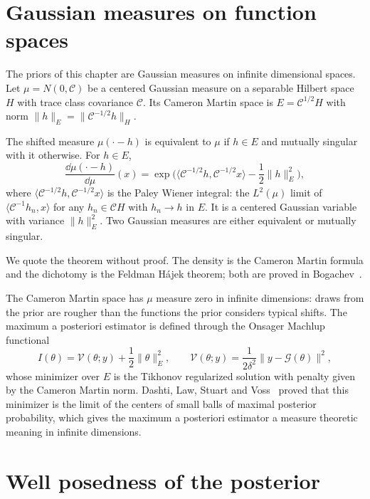 \section{Gaussian measures on function spaces}

The priors of this chapter are Gaussian measures on infinite dimensional spaces. Let $\mu = N(0,\mathcal{C})$ be a centered Gaussian measure on a separable Hilbert space $H$ with trace class covariance $\mathcal{C}$. Its Cameron Martin space is $E = \mathcal{C}^{1/2}H$ with norm $\|h\|_E = \|\mathcal{C}^{-1/2}h\|_H$.

\begin{theorem}
\label{thm:cameron_martin}
The shifted measure $\mu(\cdot-h)$ is equivalent to $\mu$ if $h\in E$ and mutually singular with it otherwise. For $h\in E$,
\[
\frac{\dd\mu(\cdot-h)}{\dd\mu}(x) = \exp\Big(\langle\mathcal{C}^{-1/2}h,\mathcal{C}^{-1/2}x\rangle-\frac12\|h\|_E^2\Big),
\]
where $\langle\mathcal{C}^{-1/2}h,\mathcal{C}^{-1/2}x\rangle$ is the Paley Wiener integral: the $L^2(\mu)$ limit of $\langle\mathcal{C}^{-1}h_n,x\rangle$ for any $h_n\in\mathcal{C}H$ with $h_n\to h$ in $E$. It is a centered Gaussian variable with variance $\|h\|_E^2$. Two Gaussian measures are either equivalent or mutually singular.
\end{theorem}

We quote the theorem without proof. The density is the Cameron Martin formula and the dichotomy is the Feldman H\'ajek theorem; both are proved in Bogachev~\cite{bogachev1998}.

The Cameron Martin space has $\mu$ measure zero in infinite dimensions: draws from the prior are rougher than the functions the prior considers typical shifts. The maximum a posteriori estimator is defined through the Onsager Machlup functional
\[
I(\theta) = \mathcal{V}(\theta;y)+\frac12\|\theta\|_E^2,\qquad\mathcal{V}(\theta;y) = \frac{1}{2\delta^2}\|y-\mathcal{G}(\theta)\|^2,
\]
whose minimizer over $E$ is the Tikhonov regularized solution with penalty given by the Cameron Martin norm. Dashti, Law, Stuart and Voss~\cite{dashti2013} proved that this minimizer is the limit of the centers of small balls of maximal posterior probability, which gives the maximum a posteriori estimator a measure theoretic meaning in infinite dimensions.

\section{Well posedness of the posterior}

